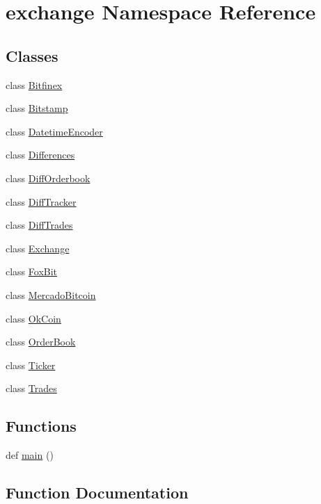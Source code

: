 \hypertarget{namespaceexchange}{}\section{exchange Namespace Reference}
\label{namespaceexchange}
\subsection*{Classes}
\begin{DoxyCompactItemize}
\item 
class \hyperlink{classexchange_1_1_bitfinex}{Bitfinex}
\item 
class \hyperlink{classexchange_1_1_bitstamp}{Bitstamp}
\item 
class \hyperlink{classexchange_1_1_datetime_encoder}{Datetime\+Encoder}
\item 
class \hyperlink{classexchange_1_1_differences}{Differences}
\item 
class \hyperlink{classexchange_1_1_diff_orderbook}{Diff\+Orderbook}
\item 
class \hyperlink{classexchange_1_1_diff_tracker}{Diff\+Tracker}
\item 
class \hyperlink{classexchange_1_1_diff_trades}{Diff\+Trades}
\item 
class \hyperlink{classexchange_1_1_exchange}{Exchange}
\item 
class \hyperlink{classexchange_1_1_fox_bit}{Fox\+Bit}
\item 
class \hyperlink{classexchange_1_1_mercado_bitcoin}{Mercado\+Bitcoin}
\item 
class \hyperlink{classexchange_1_1_ok_coin}{Ok\+Coin}
\item 
class \hyperlink{classexchange_1_1_order_book}{Order\+Book}
\item 
class \hyperlink{classexchange_1_1_ticker}{Ticker}
\item 
class \hyperlink{classexchange_1_1_trades}{Trades}
\end{DoxyCompactItemize}
\subsection*{Functions}
\begin{DoxyCompactItemize}
\item 
def \hyperlink{namespaceexchange_aa5b6297f878f52d360f5c42066aa097b}{main} ()
\end{DoxyCompactItemize}


\subsection{Function Documentation}
\mbox{\label{namespaceexchange_aa5b6297f878f52d360f5c42066aa097b}} 

